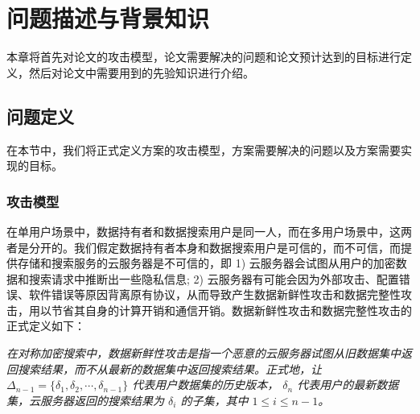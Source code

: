 \chapter{问题描述与背景知识}
\label{cha:problem}
本章将首先对论文的攻击模型，论文需要解决的问题和论文预计达到的目标进行定义，然后对论文中需要用到的先验知识进行介绍。

\section{问题定义}
在本节中，我们将正式定义方案的攻击模型，方案需要解决的问题以及方案需要实现的目标。

\subsection{攻击模型}
在单用户场景中，数据持有者和数据搜索用户是同一人，而在多用户场景中，这两者是分开的。我们假定数据持有者本身和数据搜索用户是可信的，而不可信，而提供存储和搜索服务的云服务器是不可信的，即 1) 云服务器会试图从用户的加密数据和搜索请求中推断出一些隐私信息; 2) 云服务器有可能会因为外部攻击、配置错误、软件错误等原因背离原有协议，从而导致产生数据新鲜性攻击和数据完整性攻击，用以节省其自身的计算开销和通信开销。数据新鲜性攻击和数据完整性攻击的正式定义如下：

\begin{definition}\label{def:freshness}
    {\itshape
			在对称加密搜索中，数据新鲜性攻击是指一个恶意的云服务器试图从旧数据集中返回搜索结果，而不从最新的数据集中返回搜索结果。正式地，让$\Delta_{n-1} = \{\delta_1,\delta_2,\cdots,\delta_{n-1}\}$ 代表用户数据集的历史版本， $\delta_n$ 代表用户的最新数据集，云服务器返回的搜索结果为 $\delta_i$ 的子集，其中 $1 \le i \le n-1$。
    }
\end{definition}

